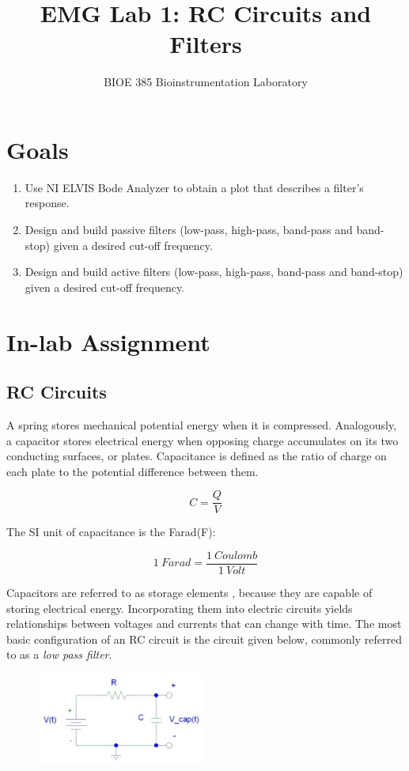 \documentclass{article}
\title{EMG Lab 1: RC Circuits and Filters}
\author{BIOE 385 Bioinstrumentation Laboratory}
\date{}
\begin{document}
\large
\maketitle

\section*{Goals}
\begin{enumerate}
	\item Use NI ELVIS Bode Analyzer to obtain a plot that describes a filter’s response.
	\item Design and build passive filters (low-pass, high-pass, band-pass and band-stop) given a desired cut-off frequency.
	\item Design and build active filters (low-pass, high-pass, band-pass and band-stop) given a desired cut-off frequency.
\end{enumerate}

\section*{In-lab Assignment}
\subsection*{RC Circuits}

A spring stores mechanical potential energy when it is compressed. Analogously, a capacitor stores electrical energy when opposing charge accumulates on its two conducting surfaces, or plates. Capacitance is defined as the ratio of charge on each plate to the potential difference between them.

$$C = \frac{Q}{V}$$

The SI unit of capacitance is the Farad(F):

$$1\ Farad = \frac{1\ Coulomb}{1\ Volt}$$

Capacitors are referred to as storage elements , because they are capable of storing electrical energy. Incorporating them into electric circuits yields relationships between voltages and currents that can change with time. The most basic configuration of an RC circuit is the circuit given below, commonly referred to as a \textit{low pass filter}.

\begin{figure}[h]
    	\includegraphics[width=0.5\textwidth]{lab_1_fig_1.jpg}
    	\centering
		\end{figure}
\end{document}
